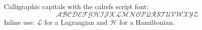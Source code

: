 \documentclass{article}
\begin{document}
Calligraphic capitals with the calrsfs script font:
\[
  \mathcal{ABCDEFGHIJKLMNOPQRSTUVWXYZ}
\]
Inline use: $\mathcal{L}$ for a Lagrangian and $\mathcal{H}$ for a Hamiltonian.
\end{document}
